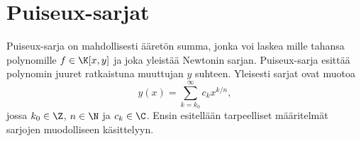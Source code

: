 \section{Puiseux-sarjat}

Puiseux-sarja on mahdollisesti ääretön summa, jonka voi laskea mille tahansa polynomille $f\in\K[x,y]$ ja joka yleistää Newtonin sarjan. Puiseux-sarja esittää polynomin juuret ratkaistuna muuttujan $y$ suhteen. Yleisesti sarjat ovat muotoa
\begin{equation*}
    y(x)=\sum_{k=k_0}^{\infty}c_kx^{k/n},
\end{equation*}
jossa $k_0\in\Z$, $n\in\N$ ja $c_k\in\C$.
Ensin esitellään tarpeelliset määritelmät sarjojen muodolliseen käsittelyyn.

